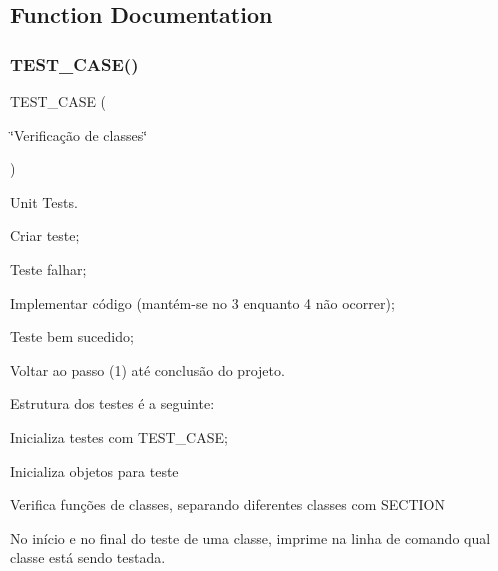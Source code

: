 \subsection{Function Documentation}
\mbox{\label{test_8cpp_a3a182bbcfc11483ae194a7fdfd431803}} 
\subsubsection{T\+E\+S\+T\+\_\+\+C\+A\+S\+E()}
{\footnotesize\ttfamily T\+E\+S\+T\+\_\+\+C\+A\+SE (\begin{DoxyParamCaption}\item[{\char`\"{}Verificação de classes\char`\"{}}]{ }\end{DoxyParamCaption})}



Unit Tests. 


\begin{DoxyEnumerate}
\item Criar teste;
\item Teste falhar;
\item Implementar código (mantém-\/se no 3 enquanto 4 não ocorrer);
\item Teste bem sucedido;
\item Voltar ao passo (1) até conclusão do projeto.
\end{DoxyEnumerate}

Estrutura dos testes é a seguinte\+:
\begin{DoxyEnumerate}
\item Inicializa testes com T\+E\+S\+T\+\_\+\+C\+A\+SE;
\item Inicializa objetos para teste
\item Verifica funções de classes, separando diferentes classes com S\+E\+C\+T\+I\+ON
\item No início e no final do teste de uma classe, imprime na linha de comando qual classe está sendo testada. 
\end{DoxyEnumerate}